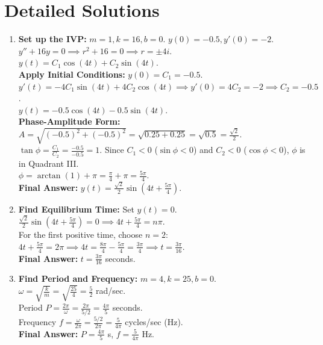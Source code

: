 \documentclass[11pt]{article}
\begin{document}
\newpage

\section{Detailed Solutions}

\begin{enumerate}[label=\textbf{\arabic*.}]
    
    \item \textbf{Set up the IVP:} $m=1, k=16, b=0$. $y(0) = -0.5, y'(0) = -2$. \\
    $y'' + 16y = 0 \implies r^2 + 16 = 0 \implies r = \pm 4i$. \\
    $y(t) = C_1 \cos(4t) + C_2 \sin(4t)$. \\
    \textbf{Apply Initial Conditions:} $y(0) = C_1 = -0.5$. \\
    $y'(t) = -4C_1 \sin(4t) + 4C_2 \cos(4t) \implies y'(0) = 4C_2 = -2 \implies C_2 = -0.5$. \\
    $y(t) = -0.5 \cos(4t) - 0.5 \sin(4t)$. \\
    \textbf{Phase-Amplitude Form:} $A = \sqrt{(-0.5)^2 + (-0.5)^2} = \sqrt{0.25 + 0.25} = \sqrt{0.5} = \frac{\sqrt{2}}{2}$. \\
    $\tan \phi = \frac{C_1}{C_2} = \frac{-0.5}{-0.5} = 1$. Since $C_1 < 0$ ($\sin \phi < 0$) and $C_2 < 0$ ($\cos \phi < 0$), $\phi$ is in Quadrant III. \\
    $\phi = \arctan(1) + \pi = \frac{\pi}{4} + \pi = \frac{5\pi}{4}$. \\
    \textbf{Final Answer:} $y(t) = \frac{\sqrt{2}}{2} \sin\left(4t + \frac{5\pi}{4}\right)$.

    \item \textbf{Find Equilibrium Time:} Set $y(t) = 0$. \\
    $\frac{\sqrt{2}}{2} \sin\left(4t + \frac{5\pi}{4}\right) = 0 \implies 4t + \frac{5\pi}{4} = n\pi$. \\
    For the first positive time, choose $n = 2$: \\
    $4t + \frac{5\pi}{4} = 2\pi \implies 4t = \frac{8\pi}{4} - \frac{5\pi}{4} = \frac{3\pi}{4} \implies t = \frac{3\pi}{16}$. \\
    \textbf{Final Answer:} $t = \frac{3\pi}{16}$ seconds.

    \item \textbf{Find Period and Frequency:} $m=4, k=25, b=0$. \\
    $\omega = \sqrt{\frac{k}{m}} = \sqrt{\frac{25}{4}} = \frac{5}{2}$ rad/sec. \\
    Period $P = \frac{2\pi}{\omega} = \frac{2\pi}{5/2} = \frac{4\pi}{5}$ seconds. \\
    Frequency $f = \frac{\omega}{2\pi} = \frac{5/2}{2\pi} = \frac{5}{4\pi}$ cycles/sec (Hz). \\
    \textbf{Final Answer:} $P = \frac{4\pi}{5}$ s, $f = \frac{5}{4\pi}$ Hz.


\end{enumerate}
\end{document}
